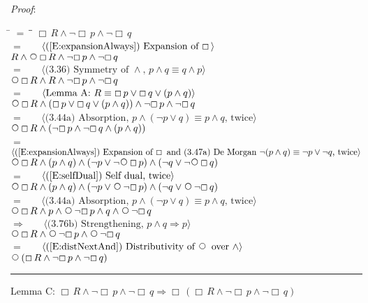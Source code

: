 \documentclass[12pt, fleqn, leqno]{article}
\newcommand{\lgap}{2pt}                             %
\newcommand{\mymathindent}{24pt}                    %
\newcommand{\impl}{\ensuremath{\Rightarrow}}        %
\newcommand{\Next}{\;\,\text{\raisebox{3.5pt}{\circle{6}}}}
\newcommand{\Always}{\Box\,}
\newcommand{\myqed}{\rule[-.23ex]{1.2ex}{2.0ex}}
\newcommand{\myqedtab}{\hspace{384pt}}              %
\newcommand{\Gll} {\langle}                         %
\newcommand{\Ggg} {\rangle}                         %
\newcommand{\Hint}[1]     {\ \ \ $\Gll              \mbox{#1} \Ggg$ }   %
\begin{document}
{\emph{Proof}:
\begin{tabbing}
\hspace{\mymathindent} \= $= \;$ \= \myqedtab \= \kill
  \> \>   $\Always R \land \neg \Always p \land \neg \Always q$\\[\lgap]
  \> $=$  \>  \Hint{(\ref{E:expansionAlways}) Expansion of $\Always$}\\[\lgap]
  \> \>   $R \land \Next \Always R \land \neg \Always p \land \neg \Always q$\\[\lgap]
  \> $=$ \> \Hint{(3.36) Symmetry of $\land$, $p\land q \equiv q\land p$} \\[\lgap]
  \> \>   $ \Next \Always R \land R \land \neg \Always p \land \neg \Always q$\\[\lgap]
   \> $=$  \>  \Hint{Lemma A: $ R \equiv \Always p \lor \Always q \lor ( p \land q)$}\\[\lgap]
   \> \>   $ \Next \Always R \land (\Always p \lor \Always q \lor ( p \land q)) \land \neg \Always p \land \neg \Always q$\\[\lgap]
   \> $=$ \> \Hint{(3.44a) Absorption, $p\land (\neg p\lor q)\equiv p\land q$, twice} \\[\lgap]
   \> \>   $ \Next \Always R \land ( \neg \Always p \land \neg \Always q \land (p \land q))$\\[\lgap]
   \> $=$  \>  \Hint{(\ref{E:expansionAlways}) Expansion of $\Always$ and (3.47a) De Morgan $\neg (p \land q) \equiv \neg p \lor \neg q$, twice}\\[\lgap]
   \> \>   $ \Next \Always R \land (p \land q) \land ( \neg p \lor  \neg\Next \Always p) \land ( \neg q \lor \neg\Next \Always q)$\\[\lgap]
   \> $=$  \>  \Hint{(\ref{E:selfDual}) Self dual, twice}\\[\lgap]
   \> \>   $ \Next \Always R \land (p \land q) \land ( \neg p \lor \Next \neg \Always p) \land ( \neg q \lor \Next \neg \Always q)$\\[\lgap]
   \> $=$ \> \Hint{(3.44a) Absorption, $p\land (\neg p\lor q)\equiv p\land q$, twice} \\[\lgap]
   \> \>   $ \Next \Always R \land p \land  \Next \neg \Always p \land q \land \Next \neg \Always q$\\[\lgap]
    \> $\impl$  \>  \Hint{(3.76b) Strengthening, $p\land q \impl p$}\\[\lgap]
     \> \>   $ \Next \Always R  \land  \Next \neg \Always p \land \Next \neg \Always q$\\[\lgap]
      \> $=$  \>  \Hint{(\ref{E:distNextAnd}) Distributivity of $\Next$ over $\land$}\\[\lgap]
       \> \>   $ \Next (\Always R  \land \neg \Always p \land \neg \Always q)$ \quad \myqed
\end{tabbing}
Lemma C: $\Always R \land \neg \Always p \land \neg \Always q \impl \Always (\Always R \land \neg \Always p \land \neg \Always q)$

}
\end{document}
